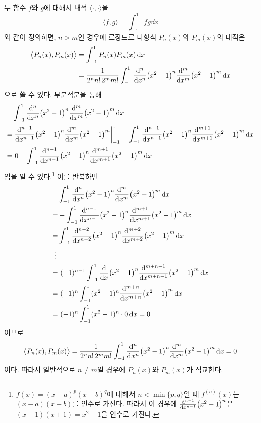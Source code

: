 \documentclass[../engineering_mathematics_lecture_note.tex]{subfiles}
\begin{document}
\begin{remark}
    두 함수 $f$와 $g$에 대해서 내적 $\langle \cdot, \cdot \rangle$을
    \begin{equation} \label{eq:inner_prod_function}
        \langle f, g \rangle = \int^1_{-1} fg \dd{x}
    \end{equation}
    와 같이 정의하면, $n > m$인 경우에 르장드르 다항식 $P_n(x)$와 $P_m(x)$의 내적은
    \begin{align*}
        \bigl\langle P_n(x), P_m(x) \bigr\rangle &= \int^1_{-1} P_n(x) P_m(x) \dd{x}\\
                                                 &= \frac{1}{2^n n!\, 2^m m!} \int^1_{-1} \dv[n]{x} (x^2 - 1)^n \dv[m]{x} (x^2 - 1)^m \dd{x}
    \end{align*}
    으로 쓸 수 있다.
    부분적분을 통해
    \begin{align*}
        &\int^1_{-1} \dv[n]{x} (x^2 - 1)^n \dv[m]{x} (x^2 - 1)^m \dd{x}\\
        = & \left.\dv[n-1]{x} (x^2 - 1)^n \dv[m]{x} (x^2 - 1)^m \right|^1_{-1} - \int^1_{-1} \dv[n-1]{x} (x^2 - 1)^n \dv[m + 1]{x} (x^2 - 1)^m \dd{x}\\
        = &\ 0 - \int^1_{-1} \dv[n-1]{x} (x^2 - 1)^n \dv[m + 1]{x} (x^2 - 1)^m \dd{x}
    \end{align*}
    임을 알 수 있다.\footnote{$f(x) = (x - a)^p (x - b)^q$에 대해서 $n < \min \{p, q\}$일 때 $f^{(n)}(x)$는 $(x - a)(x - b)$를 인수로 가진다. 따라서 이 경우에 $\dv[n - 1]{x} (x^2 - 1)^n$은 $(x - 1)(x + 1) = x^2 - 1$을 인수로 가진다.}
    이를 반복하면
    \begin{align*}
        &\int^1_{-1} \dv[n]{x} (x^2 - 1)^n \dv[m]{x} (x^2 - 1)^m \dd{x}\\
    = & - \int^1_{-1} \dv[n-1]{x} (x^2 - 1)^n \dv[m + 1]{x} (x^2 - 1)^m \dd{x}\\
    = & \int^1_{-1} \dv[n-2]{x} (x^2 - 1)^n \dv[m + 2]{x} (x^2 - 1)^m \dd{x}\\
    \vdots \, &\\
    = &\ (-1)^{n - 1} \int^1_{-1} \dv{x} (x^2 - 1)^n \dv[m + n - 1]{x} (x^2 - 1)^m \dd{x}\\
    = &\ (-1)^n \int^1_{-1} (x^2 - 1)^n \dv[m + n]{x} (x^2 - 1)^m \dd{x}\\
    = &\ (-1)^n \int^1_{-1} (x^2 - 1)^n \cdot 0 \dd{x} = 0
    \end{align*}
    이므로
    \begin{equation*}
        \bigl\langle P_n(x), P_m(x) \bigr\rangle = \frac{1}{2^n n!\, 2^m m!} \int^1_{-1} \dv[n]{x} (x^2 - 1)^n \dv[m]{x} (x^2 - 1)^m \dd{x} = 0
    \end{equation*}
    이다.
    따라서 일반적으로 $n \neq m$일 경우에 $P_n(x)$와 $P_m(x)$가 직교한다.
\end{remark}
\end{document}
